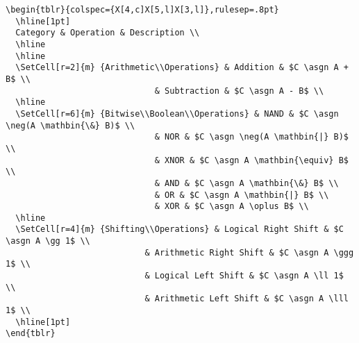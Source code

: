 \documentclass{beamer}
\newcommand*{\asgn}{\leftarrow}
\begin{document}
\begin{frame}
  \begin{lstlisting}
\begin{tblr}{colspec={X[4,c]X[5,l]X[3,l]},rulesep=.8pt}
  \hline[1pt]
  Category & Operation & Description \\
  \hline
  \hline
  \SetCell[r=2]{m} {Arithmetic\\Operations} & Addition & $C \asgn A + B$ \\
                              & Subtraction & $C \asgn A - B$ \\
  \hline
  \SetCell[r=6]{m} {Bitwise\\Boolean\\Operations} & NAND & $C \asgn \neg(A \mathbin{\&} B)$ \\
                              & NOR & $C \asgn \neg(A \mathbin{|} B)$ \\
                              & XNOR & $C \asgn A \mathbin{\equiv} B$ \\
                              & AND & $C \asgn A \mathbin{\&} B$ \\
                              & OR & $C \asgn A \mathbin{|} B$ \\
                              & XOR & $C \asgn A \oplus B$ \\
  \hline
  \SetCell[r=4]{m} {Shifting\\Operations} & Logical Right Shift & $C \asgn A \gg 1$ \\
                            & Arithmetic Right Shift & $C \asgn A \ggg 1$ \\
                            & Logical Left Shift & $C \asgn A \ll 1$ \\
                            & Arithmetic Left Shift & $C \asgn A \lll 1$ \\
  \hline[1pt]
\end{tblr}
  \end{lstlisting}
\end{frame}
\end{document}
